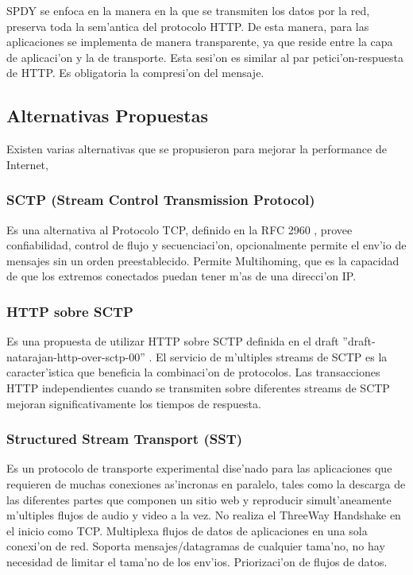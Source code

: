 SPDY se enfoca en la manera en la que se transmiten los datos por la red, preserva toda la sem'antica del protocolo HTTP. De esta manera, para las aplicaciones se implementa de manera transparente, ya que reside entre la capa de aplicaci'on y la de transporte. Esta sesi'on es similar al par petici'on-respuesta de HTTP. Es obligatoria la compresi'on del mensaje.

\subsection{Alternativas Propuestas}

Existen varias alternativas que se propusieron para mejorar la performance de Internet, 

\subsubsection{SCTP (Stream Control Transmission Protocol)}
Es una alternativa al Protocolo TCP, definido en la RFC 2960 \citep{rfcSCTP}, provee confiabilidad, control de flujo y secuenciaci'on, opcionalmente permite el env'io de mensajes sin un orden preestablecido. Permite Multihoming, que es la capacidad de que los extremos conectados puedan tener m'as de una direcci'on IP.

\subsubsection{HTTP sobre SCTP}

Es una propuesta de utilizar HTTP sobre SCTP definida en el draft ''draft-natarajan-http-over-sctp-00'' \citep{sctpHTTP}. El servicio de m'ultiples streams de SCTP es la caracter'istica que beneficia la combinaci'on de protocolos. Las transacciones HTTP independientes cuando se transmiten sobre diferentes streams de SCTP mejoran significativamente los tiempos de respuesta.

\subsubsection{Structured Stream Transport (SST)}

Es un protocolo de transporte experimental \citep{sst} dise'nado para las aplicaciones que requieren de muchas conexiones as'incronas en paralelo, tales como la descarga de las diferentes partes que componen un sitio web y reproducir simult'aneamente m'ultiples flujos de audio y video a la vez.
No realiza el ThreeWay Handshake en el inicio como TCP. Multiplexa flujos de datos de aplicaciones en una sola conexi'on de red. Soporta mensajes/datagramas de cualquier tama'no, no hay necesidad de limitar el tama'no de los env'ios. Priorizaci'on de flujos de datos.
